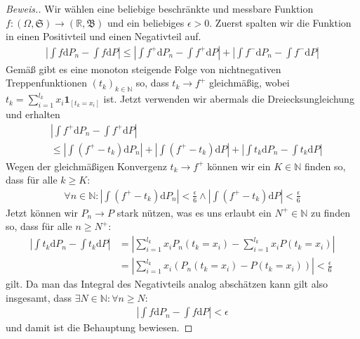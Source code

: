 \begin{proof}[Beweis.]
    Wir wählen eine beliebige beschränkte und messbare Funktion $f:(\Omega,\mathfrak{S})\to(\mathbb{R},\mathfrak{B})$ und ein beliebiges $\epsilon>0$. Zuerst spalten wir die Funktion in einen Positivteil und einen Negativteil auf.
    \begin{align*}
        \left\vert\int f\mathrm{d}P_n-\int f\mathrm{d}P\right\vert\leq\left\vert\int f^+\mathrm{d}P_n-\int f^+\mathrm{d}P\right\vert+\left\vert\int f^-\mathrm{d}P_n-\int f^-\mathrm{d}P\right\vert
    \end{align*}
    Gemäß \cite[Satz 7.30]{zbMATH06257850} gibt es eine monoton steigende Folge von nichtnegativen Treppenfunktionen $(t_k)_{k\in\mathbb{N}}$ so, dass $t_k\to f^+$ gleichmäßig, wobei $t_k=\sum_{i=1}^{l_k}x_i\mathbf{1}_{[t_k=x_i]}$ ist. Jetzt verwenden wir abermals die Dreiecksungleichung und erhalten
    \begin{align*}
        &\left\vert\int f^+\mathrm{d}P_n-\int f^+\mathrm{d}P\right\vert\\
        &\leq\left\vert\int\left(f^+-t_k\right)\mathrm{d}P_n\right\vert+\left\vert\int\left(f^+-t_k\right)\mathrm{d}P\right\vert+\left\vert\int t_k\mathrm{d}P_n-\int t_k\mathrm{d}P\right\vert
    \end{align*}
    Wegen der gleichmäßigen Konvergenz $t_k\to f^+$ können wir ein $K\in\mathbb{N}$ finden so, dass für alle $k\geq K:$
    \begin{align*}
        \forall n\in\mathbb{N}:\left\vert\int\left(f^+-t_k\right)\mathrm{d}P_n\right\vert<\frac{\epsilon}{6}\land\left\vert\int\left(f^+-t_k\right)\mathrm{d}P\right\vert<\frac{\epsilon}{6}
    \end{align*}
    Jetzt können wir $P_n\to P$ stark nützen, was es uns erlaubt ein $N^+\in\mathbb{N}$ zu finden so, dass für alle $n\geq N^+$:
    \begin{align*}
        \left\vert\int t_k\mathrm{d}P_n-\int t_k\mathrm{d}P\right\vert&=\left\vert\sum_{i=1}^{l_k}x_iP_n(t_k=x_i)-\sum_{i=1}^{l_k} x_iP(t_k=x_i)\right\vert\\
        &=\left\vert\sum_{i=1}^{l_k}x_i\left(P_n(t_k=x_i)-P(t_k=x_i)\right)\right\vert<\frac{\epsilon}{6}
    \end{align*}
    gilt. Da man das Integral des Negativteils analog abschätzen kann gilt also insgesamt, dass $\exists N\in\mathbb{N}:\forall n\geq N:$
    \begin{align*}
        \left\vert\int f\mathrm{d}P_n-\int f\mathrm{d}P\right\vert<\epsilon
    \end{align*}
    und damit ist die Behauptung bewiesen.
\end{proof}